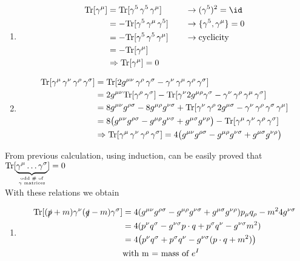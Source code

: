 \documentclass[TheoreticalPhy_ModB.tex]{subfiles}
\begin{document}
\begin{enumerate}[label=(\Roman*)]
\item 
	\begin{alignat*}{2}
	\Tr [\gamma^{\mu}] 	& = \Tr[\gamma^5 \, \gamma^5 \, \gamma^{\mu} ]		&\quad & \to (\gamma^5)^2 = \id \\
						& = - \Tr [ \gamma^5 \, \gamma^{\mu} \, \gamma^5 ]	&& \to \{ \gamma^5, \gamma^{\mu} \} = 0 \\
						& = - \Tr [ \gamma^5 \, \gamma^5 \, \gamma^{\mu} ] 	&& \to \textup{cyclicity} \\
						& = -\Tr[\gamma^{\mu}] 							&& \\
						& \so \Tr [\gamma^{\mu}] = 0						&&						
	\end{alignat*}
\item
	\begin{align*}
	\textup{Tr} [\gamma^{\mu} \, \gamma^{\nu} \, \gamma^{\rho} \, \gamma^{\sigma}]
	&= \textup{Tr} [2g^{\mu\nu} \, \gamma^{\rho}\, \gamma^{\sigma} - \gamma^{\nu}\, \gamma^{\mu}\, \gamma^{\rho}\, \gamma^{\sigma} ] \\
	& = 2g^{\mu\nu} \textup{Tr}[ \gamma^{\rho}\, \gamma^{\sigma}] - \textup{Tr}[\gamma^{\nu}2g^{\mu\rho}\gamma^{\sigma}
		- \gamma^{\nu}\, \gamma^{\rho}\, \gamma^{\mu}\, \gamma^{\sigma}] \\
	& = 8g^{\mu\nu}g^{\rho\sigma} - 8g^{\mu\rho}g^{\nu\sigma} +
		\textup{Tr}[\gamma^{\nu}\, \gamma^{\rho}\, 2g^{\mu\sigma} - \gamma^{\nu}\, \gamma^{\rho}\, \gamma^{\sigma}\, \gamma^{\mu}] \\
	& = 8 \bigl( g^{\mu\nu}g^{\rho\sigma} - g^{\mu\rho}g^{\nu\sigma} + g^{\mu\sigma}g^{\nu\rho} \bigr)
		-\textup{Tr}[\gamma^{\mu}\, \gamma^{\nu}\, \gamma^{\rho}\, \gamma^{\sigma}] \\
	& \Rightarrow \textup{Tr}[\gamma^{\mu}\, \gamma^{\nu}\, \gamma^{\rho}\, \gamma^{\sigma}] =
		4\bigl( g^{\mu\nu}g^{\rho\sigma} - g^{\mu\rho}g^{\nu\sigma} + g^{\mu\sigma}g^{\nu\rho} \bigr)
	\end{align*}
\end{enumerate}

From previous calculation, using induction, can be easily proved that $\textup{Tr}[\underbrace{\gamma^{\mu} \dots \gamma^{\sigma}}_{\textup{odd \# of} \atop \gamma \textup{ matrices}}] = 0$\\
With these relations we obtain
\begin{enumerate}[label=(\Roman*)]
\item
	\begin{align*}
	\textup{Tr}[(\slashed p + m) \gamma^{\nu}(\slashed q - m) \gamma^{\sigma}]
	& = 4(g^{\mu\nu}g^{\rho\sigma} - g^{\mu\rho}g^{\nu\sigma} + g^{\mu\sigma}g^{\nu\rho}) p_{\mu}q_{\rho} - m^2 4g^{\nu\sigma} \\
	& = 4 (p^{\nu}q^{\sigma} - g^{\nu\sigma}p \cdot q + p^{\sigma}q^{\nu} - g^{\nu\sigma}m^2) \\
	& = 4 \bigl(p^{\nu}q^{\sigma} + p^{\sigma}q^{\nu} - g^{\nu\sigma}(p \cdot q + m^2) \bigr) \\
	& \textup{with m = mass of }e^I
	\end{align*}
\end{enumerate}
\end{document}
